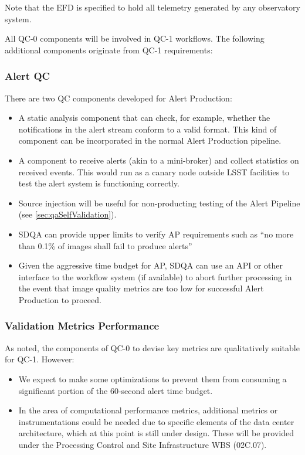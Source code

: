 \documentclass[DM,toc,lsstdraft]{lsstdoc}
\begin{document}
Note that the EFD is specified to hold all telemetry generated by any observatory system.

All QC-0 components will be involved in QC-1 workflows. The following additional components originate from QC-1 requirements:

\subsubsection{Alert QC}
\label{sec:qaAlertQA}

There are two QC components developed for Alert Production:

\begin{itemize}

\item A static analysis component that can check, for example, whether the notifications in the alert stream conform to a valid format. This kind of component can be incorporated in the normal Alert Production pipeline.

\item A component to receive alerts (akin to a mini-broker) and collect statistics on received events. This would run as a canary node outside LSST facilities to test the alert system is functioning correctly.

\item Source injection will be useful for non-producting testing of the Alert Pipeline (see \ref{sec:qaSelfValidation}).

\item SDQA can provide upper limits to verify AP requirements such as ``no more than 0.1\% of images shall fail to produce alerts''

\item Given the aggressive time budget for AP, SDQA can use an API or other interface to the workflow system (if available) to abort further processing in the event that image quality metrics are too low for successful Alert Production to proceed.

\end{itemize}

\subsubsection{Validation Metrics Performance}
\label{sec:qaPerfValidate}

As noted, the components of QC-0 to devise key metrics are qualitatively suitable for QC-1. However:

\begin{itemize}

\item We expect to make some optimizations to prevent them from consuming a significant portion of the 60-second alert time budget.

\item In the area of computational performance metrics, additional metrics or instrumentations could be needed due to specific elements of the data center architecture, which at this point is still under design. These will be provided under the Processing Control and Site Infrastructure WBS (02C.07).

\end{itemize}
\end{document}
